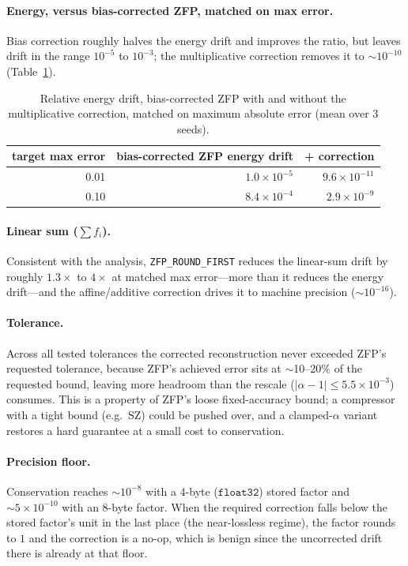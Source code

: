 \documentclass[11pt]{article}
\begin{document}
\paragraph{Energy, versus bias-corrected ZFP, matched on max error.}
Bias correction roughly halves the energy drift and improves the ratio, but
leaves drift in the range $10^{-5}$ to $10^{-3}$; the multiplicative correction
removes it to $\sim\!10^{-10}$ (Table~\ref{tab:energy}).

\begin{table}[h]
\centering
\begin{tabular}{rrr}
\toprule
target max error & bias-corrected ZFP energy drift & + correction \\
\midrule
0.01 & $1.0\times10^{-5}$ & $9.6\times10^{-11}$ \\
0.10 & $8.4\times10^{-4}$ & $2.9\times10^{-9}$ \\
\bottomrule
\end{tabular}
\caption{Relative energy drift, bias-corrected ZFP with and without the
multiplicative correction, matched on maximum absolute error (mean over 3
seeds).}
\label{tab:energy}
\end{table}

\paragraph{Linear sum ($\sum f_i$).}
Consistent with the analysis, \texttt{ZFP\_ROUND\_FIRST} reduces the linear-sum
drift by roughly $1.3\times$ to $4\times$ at matched max error---more than it
reduces the energy drift---and the affine/additive correction drives it to
machine precision ($\sim\!10^{-16}$).

\paragraph{Tolerance.}
Across all tested tolerances the corrected reconstruction never exceeded ZFP's
requested tolerance, because ZFP's achieved error sits at $\sim$10--20\% of the
requested bound, leaving more headroom than the rescale ($|\alpha-1|\le
5.5\times10^{-3}$) consumes. This is a property of ZFP's loose fixed-accuracy
bound; a compressor with a tight bound (e.g.\ SZ) could be pushed over, and a
clamped-$\alpha$ variant restores a hard guarantee at a small cost to
conservation.

\paragraph{Precision floor.}
Conservation reaches $\sim\!10^{-8}$ with a 4-byte ($\texttt{float32}$) stored
factor and $\sim\!5\times10^{-10}$ with an 8-byte factor. When the required
correction falls below the stored factor's unit in the last place (the
near-lossless regime), the factor rounds to $1$ and the correction is a no-op,
which is benign since the uncorrected drift there is already at that floor.
\end{document}
